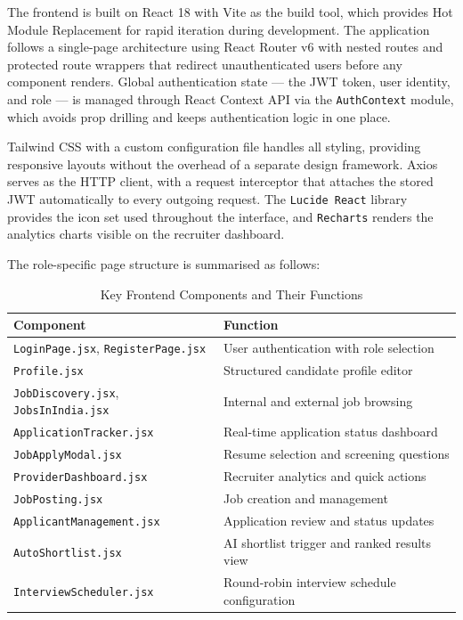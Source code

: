 \documentclass[12pt,a4paper]{report}
\begin{document}
The frontend is built on React 18 with Vite as the build tool, which provides Hot Module Replacement for rapid iteration during development. The application follows a single-page architecture using React Router v6 with nested routes and protected route wrappers that redirect unauthenticated users before any component renders. Global authentication state — the JWT token, user identity, and role — is managed through React Context API via the \texttt{AuthContext} module, which avoids prop drilling and keeps authentication logic in one place.

Tailwind CSS with a custom configuration file handles all styling, providing responsive layouts without the overhead of a separate design framework. Axios serves as the HTTP client, with a request interceptor that attaches the stored JWT automatically to every outgoing request. The \texttt{Lucide React} library provides the icon set used throughout the interface, and \texttt{Recharts} renders the analytics charts visible on the recruiter dashboard.

The role-specific page structure is summarised as follows:

\begin{table}[H]
    \centering
    \caption{Key Frontend Components and Their Functions}
    \label{tab:frontend}
    \begin{tabular}{|l|l|}
        \hline
        \textbf{Component} & \textbf{Function} \\
        \hline
        \texttt{LoginPage.jsx}, \texttt{RegisterPage.jsx} & User authentication with role selection \\
        \texttt{Profile.jsx} & Structured candidate profile editor \\
        \texttt{JobDiscovery.jsx}, \texttt{JobsInIndia.jsx} & Internal and external job browsing \\
        \texttt{ApplicationTracker.jsx} & Real-time application status dashboard \\
        \texttt{JobApplyModal.jsx} & Resume selection and screening questions \\
        \texttt{ProviderDashboard.jsx} & Recruiter analytics and quick actions \\
        \texttt{JobPosting.jsx} & Job creation and management \\
        \texttt{ApplicantManagement.jsx} & Application review and status updates \\
        \texttt{AutoShortlist.jsx} & AI shortlist trigger and ranked results view \\
        \texttt{InterviewScheduler.jsx} & Round-robin interview schedule configuration \\
        \hline
    \end{tabular}
\end{table}
\end{document}
